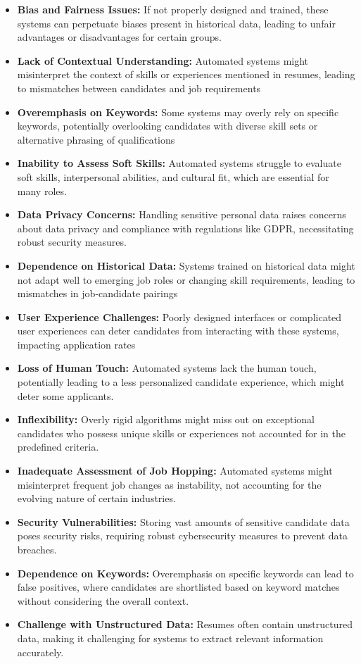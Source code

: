 \begin{itemize}
    \item \textbf{Bias and Fairness Issues:} If not properly designed and trained, these systems can perpetuate biases present in historical data, leading to unfair advantages or disadvantages for certain groups.
    \item \textbf{Lack of Contextual Understanding:} Automated systems might misinterpret the context of skills or experiences mentioned in resumes, leading to mismatches between candidates and job requirements
    \item \textbf{Overemphasis on Keywords:} Some systems may overly rely on specific keywords, potentially overlooking candidates with diverse skill sets or alternative phrasing of qualifications
    \item \textbf{Inability to Assess Soft Skills:} Automated systems struggle to evaluate soft skills, interpersonal abilities, and cultural fit, which are essential for many roles.
    \item \textbf{Data Privacy Concerns:} Handling sensitive personal data raises concerns about data privacy and compliance with regulations like GDPR, necessitating robust security measures.
    \item \textbf{Dependence on Historical Data:} Systems trained on historical data might not adapt well to emerging job roles or changing skill requirements, leading to mismatches in job-candidate pairings
    \item \textbf{User Experience Challenges:} Poorly designed interfaces or complicated user experiences can deter candidates from interacting with these systems, impacting application rates
    \item \textbf{Loss of Human Touch:} Automated systems lack the human touch, potentially leading to a less personalized candidate experience, which might deter some applicants.
    \item \textbf{Inflexibility:} Overly rigid algorithms might miss out on exceptional candidates who possess unique skills or experiences not accounted for in the predefined criteria.
    \item \textbf{Inadequate Assessment of Job Hopping:} Automated systems might misinterpret frequent job changes as instability, not accounting for the evolving nature of certain industries.
    \item \textbf{Security Vulnerabilities:} Storing vast amounts of sensitive candidate data poses security risks, requiring robust cybersecurity measures to prevent data breaches.
    \item \textbf{Dependence on Keywords:} Overemphasis on specific keywords can lead to false positives, where candidates are shortlisted based on keyword matches without considering the overall context.
    \item \textbf{Challenge with Unstructured Data:} Resumes often contain unstructured data, making it challenging for systems to extract relevant information accurately.
\end{itemize}


